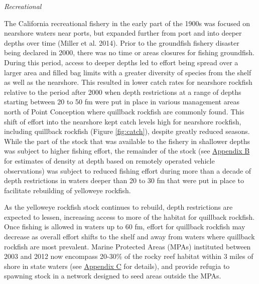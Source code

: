 \documentclass[11pt,
  english,
  a4paper,
]{article}
\begin{document}
\leavevmode\tagmcend\tagstructend\par


\emph{Recreational}

\leavevmode\tagmcend\tagstructend\par


The California recreational fishery in the early part of the 1900s was focused on nearshore waters near ports, but expanded further from port and into deeper depths over time {(Miller et al. 2014)\leavevmode\tagmcend\tagstructend}. Prior to the groundfish fishery disaster being declared in 2000, there was no time or areas closures for fishing groundfish. During this period, access to deeper depths led to effort being spread over a larger area and filled bag limits with a greater diversity of species from the shelf as well as the nearshore. This resulted in lower catch rates for nearshore rockfish relative to the period after 2000 when depth restrictions at a range of depths starting between 20 to 50 fm were put in place in various management areas north of Point Conception where quillback rockfish are commonly found. This shift of effort into the nearshore kept catch levels high for nearshore rockfish, including quillback rockfish (Figure \ref{fig:catch}), despite greatly reduced seasons. While the part of the stock that was available to the fishery in shallower depths was subject to higher fishing effort, the remainder of the stock (see {\protect\hyperlink{append_b}{Appendix B}\leavevmode\tagmcend\tagstructend} for estimates of density at depth based on remotely operated vehicle observations) was subject to reduced fishing effort during more than a decade of depth restrictions in waters deeper than 20 to 30 fm that were put in place to facilitate rebuilding of yelloweye rockfish.

\leavevmode\tagmcend\tagstructend\par


As the yelloweye rockfish stock continues to rebuild, depth restrictions are expected to lessen, increasing access to more of the habitat for quillback rockfish. Once fishing is allowed in waters up to 60 fm, effort for quillback rockfish may decrease as overall effort shifts to the shelf and away from waters where quillback rockfish are most prevalent. Marine Protected Areas (MPAs) instituted between 2003 and 2012 now encompass 20-30\% of the rocky reef habitat within 3 miles of shore in state waters (see {\protect\hyperlink{append_c}{Appendix C}\leavevmode\tagmcend\tagstructend} for details), and provide refugia to spawning stock in a network designed to seed areas outside the MPAs.
\end{document}
